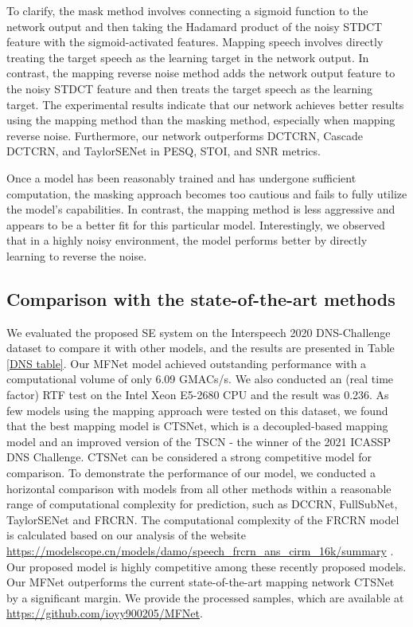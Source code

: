 \documentclass{INTERSPEECH2023}
\begin{document}
To clarify, the mask method involves connecting a sigmoid function to the network output and then taking the Hadamard product of the noisy STDCT feature with the sigmoid-activated features. Mapping speech involves directly treating the target speech as the learning target in the network output. In contrast, the mapping reverse noise method adds the network output feature to the noisy STDCT feature and then treats the target speech as the learning target. The experimental results indicate that our network achieves better results using the mapping method than the masking method, especially when mapping reverse noise. Furthermore, our network outperforms DCTCRN, Cascade DCTCRN, and TaylorSENet in PESQ, STOI, and SNR metrics.

Once a model has been reasonably trained and has undergone sufficient computation, the masking approach becomes too cautious and fails to fully utilize the model's capabilities. In contrast, the mapping method is less aggressive and appears to be a better fit for this particular model. Interestingly, we observed that in a highly noisy environment, the model performs better by directly learning to reverse the noise.



\subsection{Comparison with the state-of-the-art methods}


We evaluated the proposed SE system on the Interspeech 2020 DNS-Challenge dataset to compare it with other models, and the results are presented in Table \ref{DNS table}. Our MFNet model achieved outstanding performance with a computational volume of only 6.09 GMACs/s. We also conducted an (real time factor) RTF test on the Intel Xeon E5-2680 CPU and the result was 0.236. As few models using the mapping approach were tested on this dataset, we found that the best mapping model is CTSNet, which is a decoupled-based mapping model and an improved version of the TSCN \cite{li2021iDMP} - the winner of the 2021 ICASSP DNS Challenge. CTSNet can be considered a strong competitive model for comparison. To demonstrate the performance of our model, we conducted a horizontal comparison with models from all other methods within a reasonable range of computational complexity for prediction, such as DCCRN, FullSubNet, TaylorSENet and FRCRN. The computational complexity of the FRCRN model is calculated based on our analysis of the website \url{https://modelscope.cn/models/damo/speech_frcrn_ans_cirm_16k/summary} . Our proposed model is highly competitive among these recently proposed models. Our MFNet outperforms the current state-of-the-art mapping network CTSNet by a significant margin. We provide the processed samples, which are available at \url{https://github.com/ioyy900205/MFNet}.
\end{document}

